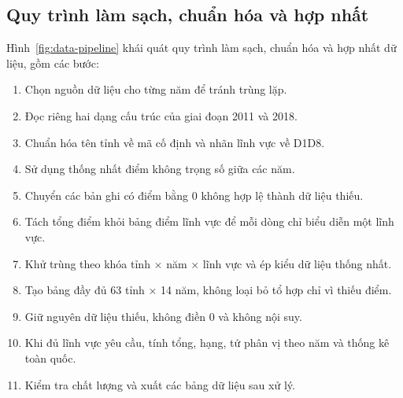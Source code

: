 \subsection{Quy trình làm sạch, chuẩn hóa và hợp nhất}

Hình~\ref{fig:data-pipeline} khái quát quy trình làm sạch, chuẩn hóa và hợp nhất dữ liệu, gồm các bước:

\begin{enumerate}
    \setlength{\itemsep}{0.15em}
    \setlength{\parskip}{0pt}
    \item Chọn nguồn dữ liệu cho từng năm để tránh trùng lặp.
    \item Đọc riêng hai dạng cấu trúc của giai đoạn 2011 và 2018.
    \item Chuẩn hóa tên tỉnh về mã cố định và nhãn lĩnh vực về D1\textendash D8.
    \item Sử dụng thống nhất điểm không trọng số giữa các năm.
    \item Chuyển các bản ghi có điểm bằng 0 không hợp lệ thành dữ liệu thiếu.
    \item Tách tổng điểm khỏi bảng điểm lĩnh vực để mỗi dòng chỉ biểu diễn một lĩnh vực.
    \item Khử trùng theo khóa tỉnh $\times$ năm $\times$ lĩnh vực và ép kiểu dữ liệu thống nhất.
    \item Tạo bảng đầy đủ 63 tỉnh $\times$ 14 năm, không loại bỏ tổ hợp chỉ vì thiếu điểm.
    \item Giữ nguyên dữ liệu thiếu, không điền 0 và không nội suy.
    \item Khi đủ lĩnh vực yêu cầu, tính tổng, hạng, tứ phân vị theo năm và thống kê toàn quốc.
    \item Kiểm tra chất lượng và xuất các bảng dữ liệu sau xử lý.
\end{enumerate}

